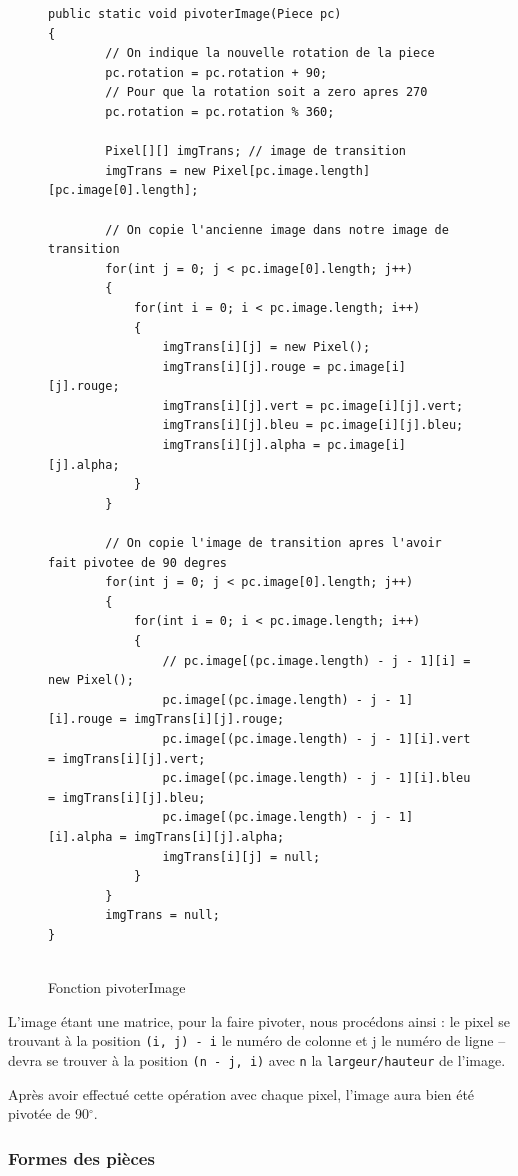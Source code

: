\documentclass[]{article}
\newcommand{\variable}[1]{\noindent \texttt{#1}}
\newcommand{\degr}[0]{$^\circ$}
\begin{document}
\begin{figure}[hpt]
	\center
	\caption{\label{Fonction pivoterImage} Fonction pivoterImage}
\begin{lstlisting}
public static void pivoterImage(Piece pc)
{
        // On indique la nouvelle rotation de la piece
        pc.rotation = pc.rotation + 90;
        // Pour que la rotation soit a zero apres 270
        pc.rotation = pc.rotation % 360;

        Pixel[][] imgTrans; // image de transition
        imgTrans = new Pixel[pc.image.length][pc.image[0].length];

        // On copie l'ancienne image dans notre image de transition
        for(int j = 0; j < pc.image[0].length; j++)
        {
            for(int i = 0; i < pc.image.length; i++)
            {
                imgTrans[i][j] = new Pixel();
                imgTrans[i][j].rouge = pc.image[i][j].rouge;
                imgTrans[i][j].vert = pc.image[i][j].vert;
                imgTrans[i][j].bleu = pc.image[i][j].bleu;
                imgTrans[i][j].alpha = pc.image[i][j].alpha;
            }
        }

        // On copie l'image de transition apres l'avoir fait pivotee de 90 degres
        for(int j = 0; j < pc.image[0].length; j++)
        {
            for(int i = 0; i < pc.image.length; i++)
            {
                // pc.image[(pc.image.length) - j - 1][i] = new Pixel();
                pc.image[(pc.image.length) - j - 1][i].rouge = imgTrans[i][j].rouge;
                pc.image[(pc.image.length) - j - 1][i].vert = imgTrans[i][j].vert;
                pc.image[(pc.image.length) - j - 1][i].bleu = imgTrans[i][j].bleu;
                pc.image[(pc.image.length) - j - 1][i].alpha = imgTrans[i][j].alpha;
                imgTrans[i][j] = null;
            }
        }
        imgTrans = null;
}


\end{lstlisting}
\end{figure}

L'image étant une matrice, pour la faire pivoter, nous procédons ainsi : le pixel se trouvant à la position \variable{(i, j) - i} le numéro de colonne et j le numéro de ligne -- devra se trouver à la position \variable{(n - j, i)} avec \variable{n} la \variable{largeur/hauteur} de l'image.

Après avoir effectué cette opération avec chaque pixel, l'image aura bien été pivotée de 90\degr.

\subsubsection{Formes des pièces}
\end{document}
